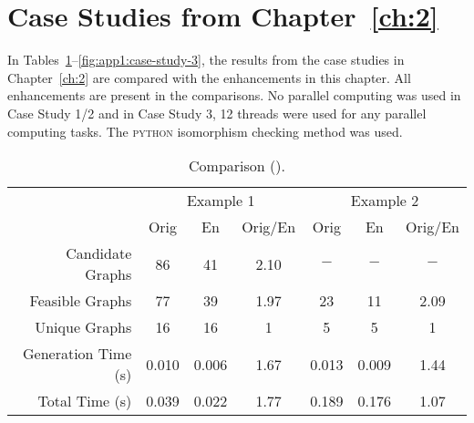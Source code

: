 \section[Case Studies from Chapter~2]{Case Studies from Chapter~\ref{ch:2}}
In Tables~\ref{fig:app1:case-study-1}--\ref{fig:app1:case-study-3}, the results from the case studies in Chapter~\ref{ch:2} are compared with the enhancements in this chapter. All enhancements are present in the comparisons. No parallel computing was used in Case Study 1/2 and in Case Study 3, 12 threads were used for any parallel computing tasks. The \textsc{python} isomorphism checking method was used.

\begin{table}[ht]
	\centering
	\begin{tabular}{r | c | c | c | c | c | c}
	\hline \hline
	& \multicolumn{3}{c|}{Example 1} & \multicolumn{3}{c}{Example 2} \\
	& Orig & En & Orig/En & Orig & En & Orig/En \\
	\hline
	Candidate Graphs & 86 & 41 & 2.10 & $-$ & $-$ & $-$ \\
	Feasible Graphs & 77 & 39 & 1.97 & 23 & 11 & 2.09 \\ 
	Unique Graphs & 16 & 16 & 1 & 5 & 5 & 1 \\ 
	Generation Time (s) & 0.010 & 0.006 & 1.67 & 0.013 & 0.009 & 1.44 \\
	Total Time (s) & 0.039 & 0.022 & 1.77 & 0.189 & 0.176& 1.07 \\
	\hline \hline
	\end{tabular}

    \caption{Comparison ().\label{fig:app1:case-study-1}}

\end{table}

